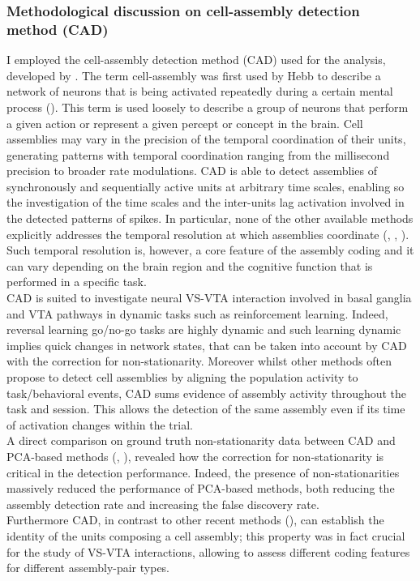 \subsubsection{Methodological discussion on cell-assembly detection method (CAD)}
I employed the cell-assembly detection method (CAD) used for the analysis, developed by . The term cell-assembly was first used by Hebb to describe a network of neurons that is being activated repeatedly during a certain mental process (\cite{Hebb}). This term is used loosely to describe a group of neurons that perform a given action or represent a given percept or concept in the brain. Cell assemblies may vary in the precision of the temporal coordination of their units, generating patterns with temporal coordination ranging from  the  millisecond precision to broader rate modulations. CAD is able to detect assemblies of synchronously and sequentially active units at arbitrary time scales, enabling so the investigation of the time scales and the inter-units lag activation involved in the detected patterns of spikes. In particular, none of the other available methods explicitly addresses the temporal resolution at which assemblies coordinate (\cite{Gruen}, \cite{Tavoni}, \cite{Billeh}). Such temporal resolution is, however, a core feature of the assembly coding and it can vary depending on the brain region and the cognitive function that is performed in a specific task.\\CAD is suited to investigate neural VS-VTA interaction involved in basal ganglia and VTA pathways in dynamic tasks such as reinforcement learning. Indeed, reversal learning go/no-go tasks are highly dynamic and such learning dynamic implies quick changes in network states, that can be taken into account by CAD with the correction for non-stationarity. Moreover whilst other methods often propose to detect cell assemblies by aligning the population activity to task/behavioral events, CAD sums evidence of assembly activity throughout the task and session. This allows the detection of the same assembly even if its time of activation changes within the trial.\\A direct comparison on ground truth non-stationarity data between CAD and PCA-based methods (\cite{Lopes}, \cite{RussoDurstewitz}), revealed how the correction for non-stationarity is critical in the detection performance. Indeed, the presence of non-stationarities massively reduced the performance of PCA-based methods, both reducing the assembly detection rate and increasing the false discovery rate.\\Furthermore CAD, in contrast to other recent methods (\cite{Watanabe2019}), can establish the identity of the units composing a cell assembly; this property was in fact crucial for the study of VS-VTA interactions, allowing to assess different coding features for different assembly-pair types.
